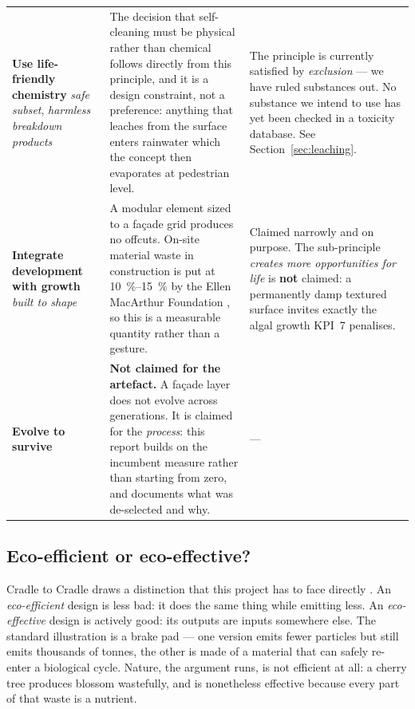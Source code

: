 \begin{table}[htbp]
\begin{tabularx}{\textwidth}{L{3.2cm} L{4.4cm} X}
\textbf{Use life-friendly chemistry} \newline \emph{safe subset}, \emph{harmless breakdown products}
& The decision that self-cleaning must be physical rather than chemical follows
directly from this principle, and it is a design constraint, not a preference:
anything that leaches from the surface enters rainwater which the concept then
evaporates at pedestrian level.
& The principle is currently satisfied by \emph{exclusion} --- we have ruled
substances out. No substance we intend to use has yet been checked in a toxicity
database. See Section~\ref{sec:leaching}. \\

\textbf{Integrate development with growth} \newline \emph{built to shape}
& A modular element sized to a façade grid produces no offcuts. On-site material
waste in construction is put at \qtyrange{10}{15}{\percent} by the Ellen
MacArthur Foundation \parencite{emf_denmark}, so this is a measurable quantity
rather than a gesture.
& Claimed narrowly and on purpose. The sub-principle \emph{creates more
opportunities for life} is \textbf{not} claimed: a permanently damp textured
surface invites exactly the algal growth KPI~7 penalises. \\

\textbf{Evolve to survive}
& \textbf{Not claimed for the artefact.} A façade layer does not evolve across
generations. It is claimed for the \emph{process}: this report builds on the
incumbent measure rather than starting from zero, and documents what was
de-selected and why.
& --- \\
\bottomrule
\end{tabularx}
\end{table}

\subsection{Eco-efficient or eco-effective?}

Cradle to Cradle draws a distinction that this project has to face directly
\parencite{braungart2002}. An \emph{eco-efficient} design is less bad: it does
the same thing while emitting less. An \emph{eco-effective} design is actively
good: its outputs are inputs somewhere else. The standard illustration is a
brake pad --- one version emits fewer particles but still emits thousands of
tonnes, the other is made of a material that can safely re-enter a biological
cycle. Nature, the argument runs, is not efficient at all: a cherry tree
produces blossom wastefully, and is nonetheless effective because every part of
that waste is a nutrient.

